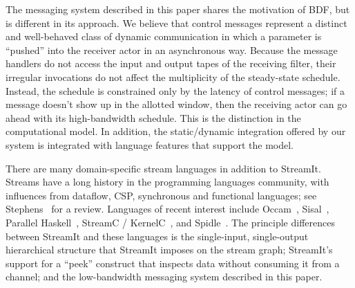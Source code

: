 The messaging system described in this paper shares the motivation of
BDF, but is different in its approach.  We believe that control
messages represent a distinct and well-behaved class of dynamic
communication in which a parameter is ``pushed'' into the receiver
actor in an asynchronous way.  Because the message handlers do not
access the input and output tapes of the receiving filter, their
irregular invocations do not affect the multiplicity of the
steady-state schedule.  Instead, the schedule is constrained only by
the latency of control messages; if a message doesn't show up in the
allotted window, then the receiving actor can go ahead with its
high-bandwidth schedule.  This is the distinction in the computational
model.  In addition, the static/dynamic integration offered by our
system is integrated with language features that support the model.

There are many domain-specific stream languages in addition to
StreamIt.  Streams have a long history in the programming languages
community, with influences from dataflow, CSP, synchronous and
functional languages; see Stephens~\cite{survey97} for a review.
Languages of recent interest include Occam~\cite{occammanual},
Sisal~\cite{sisal}, Parallel Haskell~\cite{ph}, StreamC /
KernelC~\cite{imagine03ieee}, and Spidle~\cite{spidle02}.  The
principle differences between StreamIt and these languages is the
single-input, single-output hierarchical structure that StreamIt
imposes on the stream graph; StreamIt's support for a ``peek''
construct that inspects data without consuming it from a channel; and
the low-bandwidth messaging system described in this paper.
